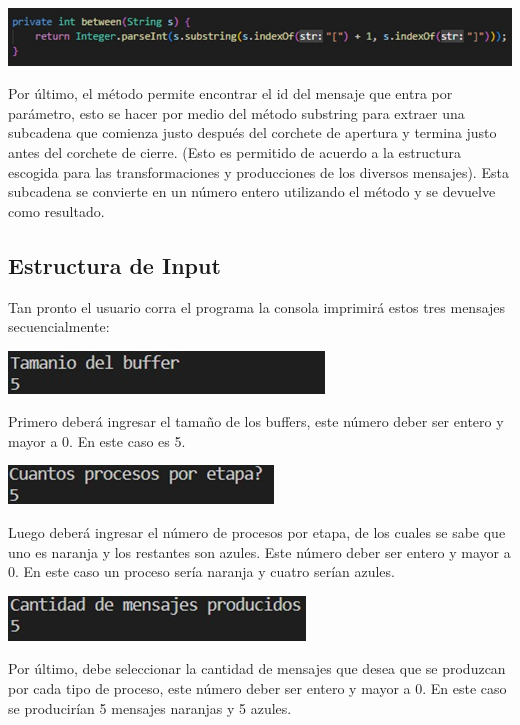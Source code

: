 \documentclass[a4paper]{article}
\begin{document}
    \begin{center}
        \includegraphics[scale=0.5]{R2.jpeg}    
    \end{center}
    Por \'ultimo, el m\'etodo  permite encontrar el id del mensaje que entra por par\'ametro, esto se hacer por medio del m\'etodo substring para extraer una subcadena que comienza justo despu\'es del corchete de apertura y termina justo antes del corchete de cierre.
    (Esto es permitido de acuerdo a la estructura escogida para las transformaciones y producciones de los diversos mensajes).
    Esta subcadena se convierte en un n\'umero entero utilizando el m\'etodo  y se devuelve como resultado.\\

    \subsection{Estructura de Input}
    Tan pronto el usuario corra el programa la consola imprimirá estos tres mensajes secuencialmente: 
    \begin{center}
        \includegraphics[scale=0.5]{I0.jpeg}    
    \end{center}
    Primero deberá ingresar el tamaño de los buffers, este número deber ser entero y mayor a 0. En este caso es 5. 
    \pagebreak
    \begin{center}
        \includegraphics[scale=0.5]{I1.jpeg}    
    \end{center}
    Luego deberá ingresar el número de procesos por etapa, de los cuales se sabe que uno es naranja y los restantes son azules. Este número deber ser entero y mayor a 0. En este caso un proceso sería naranja y cuatro serían azules. 
    \begin{center}
        \includegraphics[scale=0.5]{I2.jpeg}    
    \end{center}
    Por último, debe seleccionar la cantidad de mensajes que desea que se produzcan por cada tipo de proceso, este número deber ser entero y mayor a 0. En este caso se producirían 5 mensajes naranjas y 5 azules. 
\end{document}
